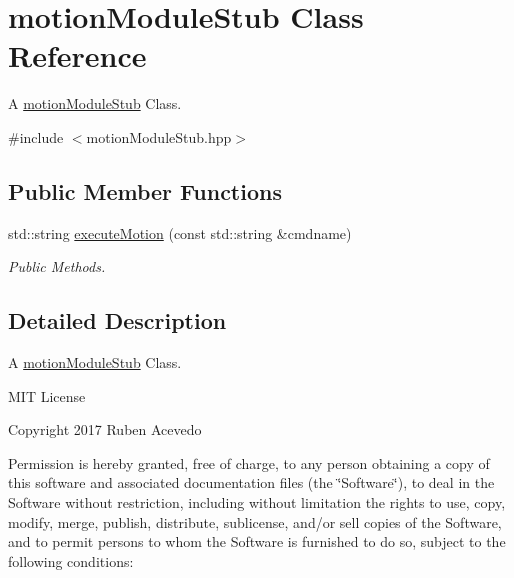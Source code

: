 \hypertarget{classmotionModuleStub}{}\section{motion\+Module\+Stub Class Reference}
\label{classmotionModuleStub}


A \hyperlink{classmotionModuleStub}{motion\+Module\+Stub} Class.  




{\ttfamily \#include $<$motion\+Module\+Stub.\+hpp$>$}

\subsection*{Public Member Functions}
\begin{DoxyCompactItemize}
\item 
std\+::string \hyperlink{classmotionModuleStub_a7054d53dcc13ea099f987fe6a157d4fa}{execute\+Motion} (const std\+::string \&cmdname)
\begin{DoxyCompactList}\small\item\em Public Methods. \end{DoxyCompactList}\end{DoxyCompactItemize}


\subsection{Detailed Description}
A \hyperlink{classmotionModuleStub}{motion\+Module\+Stub} Class. 

M\+IT License

Copyright 2017 Ruben Acevedo

Permission is hereby granted, free of charge, to any person obtaining a copy of this software and associated documentation files (the \char`\"{}\+Software\char`\"{}), to deal in the Software without restriction, including without limitation the rights to use, copy, modify, merge, publish, distribute, sublicense, and/or sell copies of the Software, and to permit persons to whom the Software is furnished to do so, subject to the following conditions\+:

